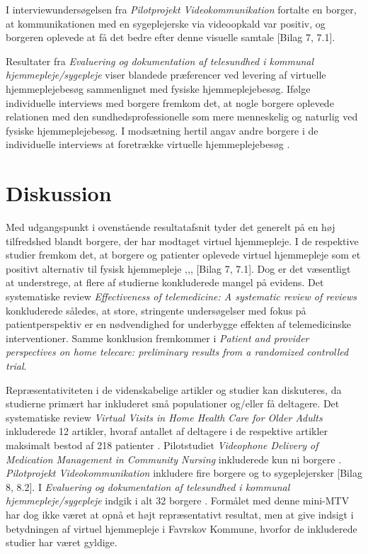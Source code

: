 I interviewundersøgelsen fra \textit{Pilotprojekt Videokommunikation} fortalte en borger, at kommunikationen med en sygeplejerske via videoopkald var positiv, og borgeren oplevede at få det bedre efter denne visuelle samtale [Bilag 7, 7.1]. 

Resultater fra \textit{Evaluering og dokumentation af telesundhed i kommunal hjemmepleje/sygepleje} viser blandede præferencer ved levering af virtuelle hjemmeplejebesøg sammenlignet med fysiske hjemmeplejebesøg. Ifølge individuelle interviews med borgere fremkom det, at nogle borgere oplevede relationen med den sundhedsprofessionelle som mere menneskelig og naturlig ved fysiske hjemmeplejebesøg. I modsætning hertil angav andre borgere i de individuelle interviews at foretrække virtuelle hjemmeplejebesøg \cite{kandidat}.

\section{Diskussion}
Med udgangspunkt i ovenstående resultatafsnit tyder det generelt på en høj tilfredshed blandt borgere, der har modtaget virtuel hjemmepleje. I de respektive studier fremkom det, at borgere og patienter oplevede virtuel hjemmepleje som et positivt alternativ til fysisk hjemmepleje \cite{wade},\cite{Baf2},\cite{kandidat}, [Bilag 7, 7.1]. Dog er det væsentligt at understrege, at flere af studierne konkluderede mangel på evidens. Det systematiske review \textit{Effectiveness of telemedicine: A systematic review of reviews} konkluderede således, at store, stringente undersøgelser med fokus på patientperspektiv er en nødvendighed for underbygge effekten af telemedicinske interventioner\cite{Ekeland}. Samme konklusion fremkommer i \textit{Patient and provider perspectives on home telecare: preliminary results from a randomized controlled trial}\cite{Mair}.

Repræsentativiteten i de videnskabelige artikler og studier kan diskuteres, da studierne primært har inkluderet små populationer og/eller få deltagere. Det systematiske review \textit{Virtual Visits in Home Health Care for Older Adults} inkluderede 12 artikler, hvoraf antallet af deltagere i de respektive artikler maksimalt bestod af 218 patienter \cite{Baf2}. Pilotstudiet \textit{Videophone Delivery of Medication Management in Community Nursing} inkluderede kun ni borgere \cite{wade}. \textit{Pilotprojekt Videokommunikation} inkludere fire borgere og to sygeplejersker [Bilag 8, 8.2]. I \textit{Evaluering og dokumentation af telesundhed i kommunal hjemmepleje/sygepleje} indgik i alt 32 borgere \cite{kandidat}. Formålet med denne mini-MTV har dog ikke været at opnå et højt repræsentativt resultat, men at give indsigt i betydningen af virtuel hjemmepleje i Favrskov Kommune, hvorfor de inkluderede studier har været gyldige. 

